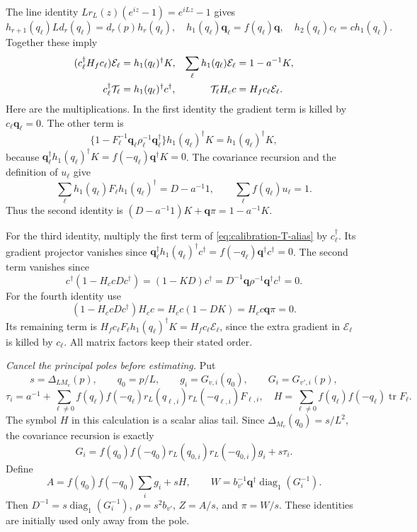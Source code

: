 \documentclass[11pt,reqno]{amsart}
\numberwithin{equation}{section}
\theoremstyle{definition}
\theoremstyle{remark}
\DeclareMathOperator{\tr}{tr}
\begin{document}
The line identity
\(Lr_L(z)(e^{iz}-1)=e^{iLz}-1\) gives
\[
 h_{r+1}(q_\ell)Ld_r(q_\ell)=d_r(p)h_r(q_\ell),
 \quad h_1(q_\ell)\mathbf q_\ell=f(q_\ell)\mathbf q,
 \quad h_2(q_\ell)c_\ell=ch_1(q_\ell).
\]
Together these imply
\begin{align}
 (c_\ell^\dagger H_fc_\ell)\mathcal E_\ell
      &=h_1(q_\ell)^\dagger K,
 &\sum_\ell h_1(q_\ell)\mathcal E_\ell&=1-a^{-1}K,\notag\\
 c_\ell^\dagger\mathcal T_\ell
      &=h_1(q_\ell)^\dagger c^\dagger,
 &\mathcal T_\ell H_cc&=H_fc_\ell\mathcal E_\ell.
 \label{eq:calibration-alias-identities}
\end{align}
Here are the multiplications. In the first identity the
gradient term is killed by \(c_\ell\mathbf q_\ell=0\).
The other term is
\[
 \{1-F_\ell^{-1}\mathbf q_\ell\rho_\ell^{-1}
                     \mathbf q_\ell^\dagger\}
                       h_1(q_\ell)^\dagger K=h_1(q_\ell)^\dagger K,
\]
because \(\mathbf q_\ell^\dagger h_1(q_\ell)^\dagger K
=f(-q_\ell)\mathbf q^\dagger K=0\).
The covariance recursion and the definition of \(u_\ell\) give
\[
 \sum_\ell h_1(q_\ell)F_\ell h_1(q_\ell)^\dagger=D-a^{-1}1,
                      \qquad \sum_\ell f(q_\ell)u_\ell=1.
\]
Thus the second identity is
\((D-a^{-1}1)K+\mathbf q\pi=1-a^{-1}K\).

For the third identity, multiply the first term of
\eqref{eq:calibration-T-alias} by \(c_\ell^\dagger\).
Its gradient projector vanishes since
\(\mathbf q_\ell^\dagger h_1(q_\ell)^\dagger c^\dagger
=f(-q_\ell)\mathbf q^\dagger c^\dagger=0\).
The second term vanishes since
\[
 c^\dagger(1-H_ccDc^\dagger)
   =(1-KD)c^\dagger
   =D^{-1}\mathbf q\rho^{-1}\mathbf q^\dagger c^\dagger=0.
\]
For the fourth identity use
\[
 (1-H_ccDc^\dagger)H_cc=H_cc(1-DK)=H_cc\mathbf q\pi=0.
\]
Its remaining term is
\(H_fc_\ell F_\ell h_1(q_\ell)^\dagger K
=H_fc_\ell\mathcal E_\ell\), since the extra gradient
in \(\mathcal E_\ell\) is killed by \(c_\ell\).
All matrix factors keep their stated order.

\smallskip\noindent
\emph{Cancel the principal poles before estimating.}
Put
\[
 s=\Delta_{LM_v}(p),\qquad q_0=p/L,\qquad
 g_i=G_{v,i}(q_0),\qquad G_i=G_{v',i}(p),
\]
\[
 \tau_i=a^{-1}+\sum_{\ell\ne0}f(q_\ell)f(-q_\ell)
                   r_L(q_{\ell,i})r_L(-q_{\ell,i})F_{\ell,i},
 \quad H=\sum_{\ell\ne0}f(q_\ell)f(-q_\ell)\tr F_\ell.
\]
The symbol \(H\) in this calculation is a scalar alias tail.
Since \(\Delta_{M_v}(q_0)=s/L^2\), the covariance recursion
is exactly
\begin{equation}
 G_i=f(q_0)f(-q_0)r_L(q_{0,i})r_L(-q_{0,i})g_i+s\tau_i.
 \label{eq:calibration-principal-cancellation}
\end{equation}
Define
\[
 A=f(q_0)f(-q_0)\sum_i g_i+sH,\qquad
 W=b_{v'}^{-1}\mathbf q^\dagger\operatorname{diag}_1(G_i^{-1}).
\]
Then \(D^{-1}=s\operatorname{diag}_1(G_i^{-1})\),
\(\rho=s^2b_{v'}\), \(Z=A/s\), and \(\pi=W/s\).
These identities are initially used only away from the pole.
\end{document}
